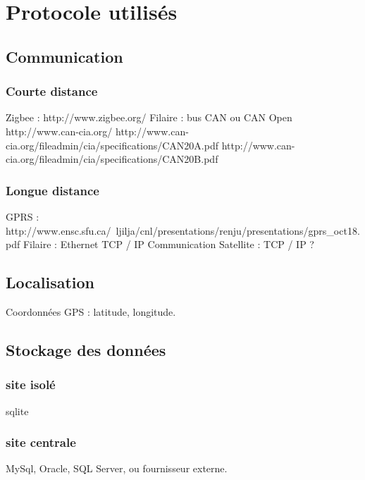 \section{Protocole utilisés}

    \subsection{Communication}
    
        \subsubsection{Courte distance}
            Zigbee : http://www.zigbee.org/
            Filaire : bus CAN ou CAN Open
                http://www.can-cia.org/
                http://www.can-cia.org/fileadmin/cia/specifications/CAN20A.pdf
                http://www.can-cia.org/fileadmin/cia/specifications/CAN20B.pdf
        
        \subsubsection{Longue distance}
            GPRS : http://www.ensc.sfu.ca/~ljilja/cnl/presentations/renju/presentations/gprs_oct18.pdf
            Filaire : Ethernet TCP / IP
            Communication Satellite : TCP / IP ?
        
    \subsection{Localisation}
    
        Coordonnées GPS : latitude, longitude.
    
    \subsection{Stockage des données}
    
        \subsubsection{site isolé}
            sqlite
        
        \subsubsection{site centrale}
            MySql, Oracle, SQL Server, ou fournisseur externe.
